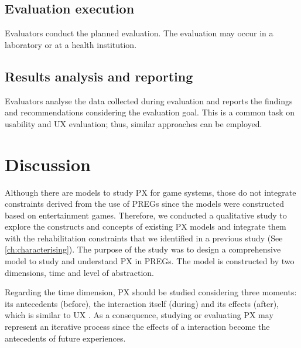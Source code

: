 \subsection{Evaluation execution}
Evaluators conduct the planned evaluation. The evaluation may occur in a laboratory or at a health institution.

\subsection{Results analysis and reporting}
Evaluators analyse the data collected during evaluation and reports the findings and recommendations considering the evaluation goal. This is a common task on usability and \ac{UX} evaluation; thus, similar approaches can be employed.


\section{Discussion} %
\label{sec:discussion_model}
Although there are models to study \ac{PX} for game systems, those do not integrate constraints derived from the use of \acp{PREG} since the models were constructed based on entertainment games. Therefore, we conducted a qualitative study to explore the constructs and concepts of existing \ac{PX} models and integrate them with the rehabilitation constraints that we identified in a previous study (See \autoref{ch:characterising}). The purpose of the study was to design a comprehensive model to study and understand \ac{PX} in \acp{PREG}. The model is constructed by two dimensions, time and level of abstraction. 


Regarding the time dimension, \ac{PX} should be studied considering three moments: its antecedents (before), the interaction itself (during) and its effects (after), which is similar to \ac{UX} \autocite{iso9241:210}. As a consequence, studying or evaluating \ac{PX} may represent an iterative process since the effects of a interaction become the antecedents of future experiences.

